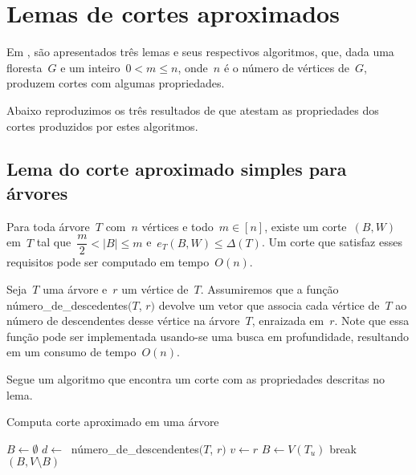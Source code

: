 \section {Lemas de cortes aproximados}

Em \cite{Schmidt15}, são apresentados três lemas e seus
respectivos algoritmos, que, dada uma floresta~$G$ e um 
inteiro~$0<m\le n$, onde~$n$ é o número de vértices de~$G$, 
produzem cortes com algumas propriedades.

Abaixo reproduzimos os três resultados de \cite{Schmidt15} que 
atestam as propriedades dos cortes produzidos por estes algoritmos.

\bigskip
\bigskip
\bigskip

\subsection{Lema do corte aproximado simples para árvores}
\begin{lem}[]
\label{lema:simpleApproxCutTree}
	Para toda árvore~$T$ com~$n$ vértices e todo~$m \in [n]$,
	existe um corte~$(B,W)$ em~$T$ tal 
	que~${\dfrac{m}{2} <|B| \le m}$ e~${e_T(B,W) \le \Delta(T)}$.
	Um corte que satisfaz esses requisitos pode ser computado em
	tempo~$O(n)$.
\end{lem}

\bigskip

Seja~$T$ uma árvore e~$r$ um vértice de~$T$. 
Assumiremos que
a função {\sc número\_de\_descedentes}$(T$, $r)$ devolve um vetor
que associa cada vértice de~$T$ ao número de descendentes desse 
vértice na árvore~$T$, enraizada em~$r$. Note que essa função 
pode ser implementada usando-se uma busca em profundidade,
resultando em um consumo de tempo~$O(n)$.


Segue um algoritmo que encontra um corte com as propriedades 
descritas no lema.

\medskip

\begin{algorithm}[H]
\label{alg:simpleApproxCutTree}

	\caption{Computa corte aproximado em uma árvore}
	$B \gets \emptyset$\;
	{
		$d \gets~$ {\sc número\_de\_descendentes}$(T$, $r)$\;
		$v \gets r$\;
		{
			$B\gets V(T_u)$\;  
		}
		{
		{
			{
				break\;
			}
		}
		}
	}
	\Return $(B,V\setminus B)$

\end{algorithm}	

